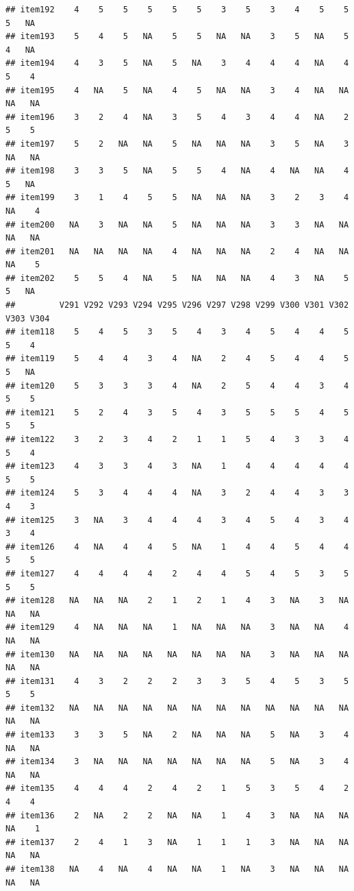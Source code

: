 \documentclass[
  man]{apa6}
\begin{document}
\begin{verbatim}
## item192    4    5    5    5    5    5    3    5    3    4    5    5    5   NA
## item193    5    4    5   NA    5    5   NA   NA    3    5   NA    5    4   NA
## item194    4    3    5   NA    5   NA    3    4    4    4   NA    4    5    4
## item195    4   NA    5   NA    4    5   NA   NA    3    4   NA   NA   NA   NA
## item196    3    2    4   NA    3    5    4    3    4    4   NA    2    5    5
## item197    5    2   NA   NA    5   NA   NA   NA    3    5   NA    3   NA   NA
## item198    3    3    5   NA    5    5    4   NA    4   NA   NA    4    5   NA
## item199    3    1    4    5    5   NA   NA   NA    3    2    3    4   NA    4
## item200   NA    3   NA   NA    5   NA   NA   NA    3    3   NA   NA   NA   NA
## item201   NA   NA   NA   NA    4   NA   NA   NA    2    4   NA   NA   NA    5
## item202    5    5    4   NA    5   NA   NA   NA    4    3   NA    5    5   NA
##         V291 V292 V293 V294 V295 V296 V297 V298 V299 V300 V301 V302 V303 V304
## item118    5    4    5    3    5    4    3    4    5    4    4    5    5    4
## item119    5    4    4    3    4   NA    2    4    5    4    4    5    5   NA
## item120    5    3    3    3    4   NA    2    5    4    4    3    4    5    5
## item121    5    2    4    3    5    4    3    5    5    5    4    5    5    5
## item122    3    2    3    4    2    1    1    5    4    3    3    4    5    4
## item123    4    3    3    4    3   NA    1    4    4    4    4    4    5    5
## item124    5    3    4    4    4   NA    3    2    4    4    3    3    4    3
## item125    3   NA    3    4    4    4    3    4    5    4    3    4    3    4
## item126    4   NA    4    4    5   NA    1    4    4    5    4    4    5    5
## item127    4    4    4    4    2    4    4    5    4    5    3    5    5    5
## item128   NA   NA   NA    2    1    2    1    4    3   NA    3   NA   NA   NA
## item129    4   NA   NA   NA    1   NA   NA   NA    3   NA   NA    4   NA   NA
## item130   NA   NA   NA   NA   NA   NA   NA   NA    3   NA   NA   NA   NA   NA
## item131    4    3    2    2    2    3    3    5    4    5    3    5    5    5
## item132   NA   NA   NA   NA   NA   NA   NA   NA   NA   NA   NA   NA   NA   NA
## item133    3    3    5   NA    2   NA   NA   NA    5   NA    3    4   NA   NA
## item134    3   NA   NA   NA   NA   NA   NA   NA    5   NA    3    4   NA   NA
## item135    4    4    4    2    4    2    1    5    3    5    4    2    4    4
## item136    2   NA    2    2   NA   NA    1    4    3   NA   NA   NA   NA    1
## item137    2    4    1    3   NA    1    1    1    3   NA   NA   NA   NA   NA
## item138   NA    4   NA    4   NA   NA    1   NA    3   NA   NA   NA   NA   NA

\end{verbatim}
\end{document}
